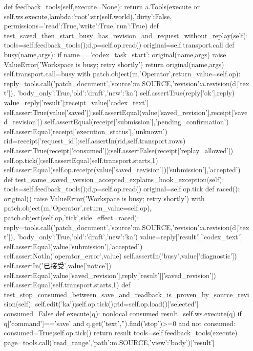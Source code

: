  def feedback_tools(self,execute=None):
  return a.Tools(execute or self.ws.execute,lambda:{'root':str(self.world),'dirty':False},
                 permissions={'read':True,'write':True,'run':True})
 def test_saved_then_start_busy_has_revision_and_request_without_replay(self):
  tools=self.feedback_tools();d,p=self.op.read()
  original=self.transport.call
  def busy(name,args):
   if name=='codex_task_start':
    original(name,args)
    raise ValueError('Workspace is busy; retry shortly')
   return original(name,args)
  self.transport.call=busy
  with patch.object(m,'Operator',return_value=self.op):
   reply=tools.call('patch_document',{'source':m.SOURCE,'revision':a.revision(d['text']),
       'body_only':True,'old':'draft','new':'ka'})
  self.assertTrue(reply['ok'],reply)
  value=reply['result'];receipt=value['codex_text']
  self.assertTrue(value['saved']);self.assertEqual(value['saved_revision'],receipt['saved_revision'])
  self.assertEqual(receipt['submission'],'pending_confirmation')
  self.assertEqual(receipt['execution_status'],'unknown')
  rid=receipt['request_id'];self.assertIn(rid,self.transport.rows)
  self.assertTrue(receipt['consumed']);self.assertFalse(receipt['replay_allowed'])
  self.op.tick();self.assertEqual(self.transport.starts,1)
  self.assertEqual(self.op.receipt(value['saved_revision'])['submission'],'accepted')
 def test_same_saved_version_accepted_explains_hook_exception(self):
  tools=self.feedback_tools();d,p=self.op.read()
  original=self.op.tick
  def raced():
   original()
   raise ValueError('Workspace is busy; retry shortly')
  with patch.object(m,'Operator',return_value=self.op), patch.object(self.op,'tick',side_effect=raced):
   reply=tools.call('patch_document',{'source':m.SOURCE,'revision':a.revision(d['text']),
       'body_only':True,'old':'draft','new':'ka'})
  value=reply['result']['codex_text']
  self.assertEqual(value['submission'],'accepted')
  self.assertNotIn('operator_error',value)
  self.assertIn('busy',value['diagnostic'])
  self.assertIn('已接受',value['notice'])
  self.assertEqual(value['saved_revision'],reply['result']['saved_revision'])
  self.assertEqual(self.transport.starts,1)
 def test_stop_consumed_between_save_and_readback_is_proven_by_source_revision(self):
  self.edit('ka');self.op.tick();rid=self.op.load()['selected']
  consumed=False
  def execute(q):
   nonlocal consumed
   result=self.ws.execute(q)
   if q['command']=='save' and q.get('text','').find('stop')>=0 and not consumed:
    consumed=True;self.op.tick()
   return result
  tools=self.feedback_tools(execute)
  page=tools.call('read_range',{'path':m.SOURCE,'view':'body'})['result']
